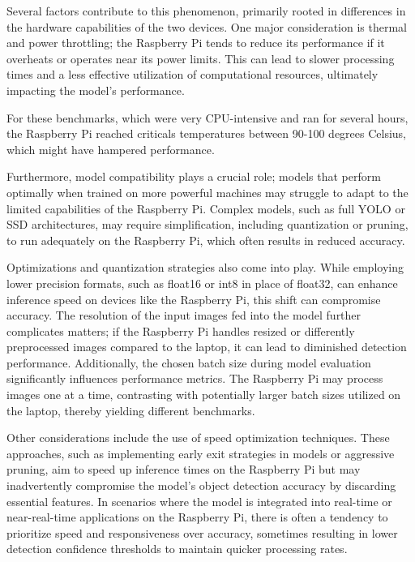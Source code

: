 \documentclass[12pt]{article}
\begin{document}
Several factors contribute to this phenomenon, primarily rooted in differences in the hardware capabilities of the two devices. One major consideration is thermal and power throttling; the Raspberry Pi tends to reduce its performance if it overheats or operates near its power limits. This can lead to slower processing times and a less effective utilization of computational resources, ultimately impacting the model's performance.

For these benchmarks, which were very CPU-intensive and ran for several hours, the Raspberry Pi reached criticals temperatures between 90-100 degrees Celsius, which might have hampered performance.

Furthermore, model compatibility plays a crucial role; models that perform optimally when trained on more powerful machines may struggle to adapt to the limited capabilities of the Raspberry Pi. Complex models, such as full YOLO or SSD architectures, may require simplification, including quantization or pruning, to run adequately on the Raspberry Pi, which often results in reduced accuracy.

Optimizations and quantization strategies also come into play. While employing lower precision formats, such as float16 or int8 in place of float32, can enhance inference speed on devices like the Raspberry Pi, this shift can compromise accuracy. The resolution of the input images fed into the model further complicates matters; if the Raspberry Pi handles resized or differently preprocessed images compared to the laptop, it can lead to diminished detection performance. Additionally, the chosen batch size during model evaluation significantly influences performance metrics. The Raspberry Pi may process images one at a time, contrasting with potentially larger batch sizes utilized on the laptop, thereby yielding different benchmarks.

Other considerations include the use of speed optimization techniques. These approaches, such as implementing early exit strategies in models or aggressive pruning, aim to speed up inference times on the Raspberry Pi but may inadvertently compromise the model's object detection accuracy by discarding essential features. In scenarios where the model is integrated into real-time or near-real-time applications on the Raspberry Pi, there is often a tendency to prioritize speed and responsiveness over accuracy, sometimes resulting in lower detection confidence thresholds to maintain quicker processing rates.
\end{document}
